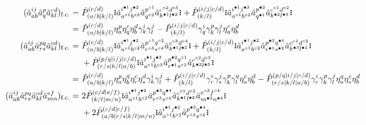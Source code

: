 \documentclass[11pt,fleqn]{article}
\newcommand{\g}{\gamma}      %
\newcommand{\h}{\eta}        %
\newcommand{\tl}{\ensuremath{\tilde}}
\newcommand{\op}[1]{\ensuremath{\hat{#1}}}
\newcommand{\GNO}[1]{\setstackgap{S}{0.7pt}\ensuremath{\Shortstack{\textbf{.} \textbf{.} \textbf{.}}#1\Shortstack{\textbf{.} \textbf{.} \textbf{.}}}}
\theoremstyle{mystyle}
\newcommand{\hole}{\circ}
\newcommand{\ptcl}{\bullet}
\begin{document}
\begin{align*}
  (\tl{a}_{ab}^{ij}\tl{a}_q^p\tl{a}_{kl}^{cd})_{\text{f.c.}}
=&\
  \op{P}^{(c/d)}
        _{(a/b|k/l)}
  \GNO{
    \tl{a}_{a^{\hole1}b^{\hole3}}
          ^{i^{\ptcl1}j^{\ptcl2}}
    \tl{a}_{q^{\hole2}}
          ^{p^{\hole1}}
    \tl{a}_{k^{\ptcl1}l^{\ptcl2}}
          ^{c^{\hole2}d^{\hole3}}
  }
+
  \op{P}^{(i/j|c/d)}
        _{(k/l)}
  \GNO{
    \tl{a}_{a^{\hole1}b^{\hole2}}
          ^{i^{\ptcl1}j^{\ptcl3}}
    \tl{a}_{q^{\ptcl1}}
          ^{p^{\ptcl2}}
    \tl{a}_{k^{\ptcl2}l^{\ptcl3}}
          ^{c^{\hole1}d^{\hole2}}
  }
\\=&\
  \op{P}^{(c/d)}
        _{(a/b|k/l)}
  \h_a^p\h_q^c\h_b^d\g_k^i\g_l^j
-
  \op{P}^{(i/j|c/d)}
        _{(k/l)}
  \g_q^i\g_k^p\g_l^j\h_a^c\h_b^d
\\
  (\tl{a}_{ab}^{ij}\tl{a}_{rs}^{pq}\tl{a}_{kl}^{cd})_{\text{f.c.}}
=&\
  \op{P}^{(c/d)}
        _{(a/b|k/l)}
  \GNO{
    \tl{a}_{a^{\hole1}b^{\hole2}}
          ^{i^{\ptcl1}j^{\ptcl2}}
    \tl{a}_{r^{\hole3}s^{\hole4}}
          ^{p^{\hole1}q^{\hole2}}
    \tl{a}_{k^{\ptcl1}l^{\ptcl2}}
          ^{c^{\hole3}d^{\hole4}}
  }
+
  \op{P}^{(i/j|c/d)}
        _{(k/l)}
  \GNO{
    \tl{a}_{a^{\hole1}b^{\hole2}}
          ^{i^{\ptcl1}j^{\ptcl2}}
    \tl{a}_{r^{\ptcl1}s^{\ptcl2}}
          ^{p^{\ptcl3}q^{\ptcl4}}
    \tl{a}_{k^{\ptcl3}l^{\ptcl4}}
          ^{c^{\hole1}d^{\hole2}}
  }
\\&\
+
  \op{P}^{(p/q|i/j|c/d)}
        _{(r/s|k/l|a/b)}
  \GNO{
    \tl{a}_{a^{\hole1}b^{\hole3}}
          ^{i^{\ptcl1}j^{\ptcl3}}
    \tl{a}_{r^{\ptcl1}s^{\hole2}}
          ^{p^{\ptcl2}q^{\hole1}}
    \tl{a}_{k^{\ptcl2}l^{\ptcl3}}
          ^{c^{\hole2}d^{\hole3}}
  }
\\=&\
  \op{P}^{(c/d)}
        _{(a/b|k/l)}
  \h_a^p\h_b^q\h_r^c\h_s^d
  \g_k^i\g_l^j
+
  \op{P}^{(i/j|c/d)}
        _{(k/l)}
  \g_r^i\g_s^j\g_k^p\g_l^q
  \h_a^c\h_b^d
-
  \op{P}^{(p/q|i/j|c/d)}
        _{(r/s|k/l|a/b)}
  \g_r^i\g_k^p\g_l^j
  \h_a^q\h_s^c\h_b^d
\\
  (\tl{a}_{ab}^{ij}\tl{a}_{rs}^{pq}\tl{a}_{kl}^{cd}\tl{a}_{mn}^{ef})_{\text{f.c.}}
=&\
  2
  \op{P}_{(k/l|m/n)}^{(c/d|e/f)}
  \GNO{
    \tl{a}_{a^{\hole1}b^{\hole2}}^{i^{\ptcl1}j^{\ptcl2}}
    \tl{a}_{r^{\hole3}s^{\hole4}}^{p^{\ptcl3}q^{\ptcl4}}
    \tl{a}_{k^{\ptcl1}l^{\ptcl2}}^{c^{\hole1}d^{\hole2}}
    \tl{a}_{m^{\ptcl3}n^{\ptcl4}}^{e^{\hole3}f^{\hole4}}
  }
\\&\
+
  2
  \op{P}_{(a/b|r/s|k/l|m/n)}^{(c/d|e/f)}
  \GNO{
    \tl{a}_{a^{\hole1}b^{\hole2}}^{i^{\ptcl1}j^{\ptcl2}}
    \tl{a}_{r^{\hole3}s^{\hole4}}^{p^{\ptcl3}q^{\ptcl4}}
}
\end{align*}
\end{document}
